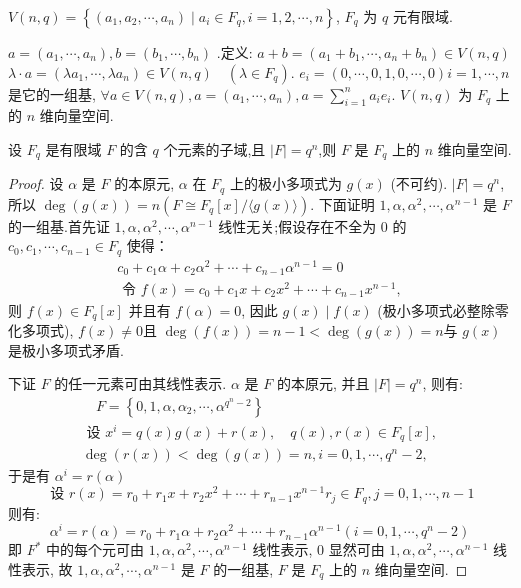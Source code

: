 \begin{example}
    $ V(n, q)=\left\{\left(a_{1}, a_{2}, \cdots, a_{n}\right) \mid a_{i} \in F_{q}, i=1,2, \cdots, n\right\} $, $ F_{q} $ 为 $ q $ 元有限域.
    
$ a=\left(a_{1}, \cdots, a_{n}\right), b=\left(b_{1}, \cdots, b_{n}\right)  $ .定义:
$ a+b=\left(a_{1}+b_{1}, \cdots, a_{n}+b_{n}\right) \in V(n, q) $\\
$ \lambda \cdot a=\left(\lambda a_{1}, \cdots, \lambda a_{n}\right) \in V(n, q) \quad\left(\lambda \in F_{q}\right) $. 
$ e_{i}=(0, \cdots, 0,1,0, \cdots, 0) i=1, \cdots, n $ 是它的一组基,
$ \forall a \in V(n, q), a=\left(a_{1}, \cdots, a_{n}\right), a=\sum\limits_{i=1}^{n} a_{i} e_{i} $. 
$ V(n, q) $ 为 $ F_{q} $ 上的 $ n $ 维向量空间.
\end{example}

\begin{theorem}
    设 $ F_{q} $ 是有限域 $ F $ 的含 $ q $ 个元素的子域,且 $ |F|=q^{n} $,则 $ F $ 是 $ F_{q} $ 上的 $ n $ 维向量空间.
\end{theorem}
\begin{proof}
    设 $ \alpha $ 是 $ F $ 的本原元, $ \alpha $ 在 $ F_{q} $ 上的极小多项式为 $ g(x) $ (不可约). $ |F|=q^{n} $, 所以 $ \operatorname{deg}(g(x))=n\left(F \cong F_{q}[x] /\langle g(x)\rangle\right) $. 下面证明 $ 1, \alpha, \alpha^{2}, \cdots, \alpha^{n-1} $ 是 $ F $ 的一组基.首先证 $ 1, \alpha, \alpha^{2}, \cdots, \alpha^{n-1} $ 线性无关;假设存在不全为 0 的 $ c_{0}, c_{1}, \cdots, c_{n-1} \in F_{q} $ 使得：
    $$
\begin{array}{c}
c_{0}+c_{1} \alpha+c_{2} \alpha^{2}+\cdots+c_{n-1} \alpha^{n-1}=0 \\
\text { 令 } f(x)=c_{0}+c_{1} x+c_{2} x^{2}+\cdots+c_{n-1} x^{n-1},
\end{array}
$$
则 $ f(x) \in F_{q}[x] $ 并且有 $ f(\alpha)=0 $,
因此 $ g(x) \mid f(x) $ (极小多项式必整除零化多项式), $ f(x) \neq 0 $且 $ \operatorname{deg}(f(x))=n-1<\operatorname{deg}(g(x))=n $与 $ g(x) $ 是极小多项式矛盾.

下证 $ F $ 的任一元素可由其线性表示. $ \alpha $ 是 $ F $ 的本原元, 并且 $ |F|=q^{n} $, 则有:
$$
\begin{array}{l}
\quad F=\left\{0,1, \alpha, \alpha_{2}, \cdots, \alpha^{q^{n}-2}\right\} \\
\text { 设 } x^{i}=q(x) g(x)+r(x), \quad q(x), r(x) \in F_{q}[x], \\
\operatorname{deg}(r(x))<\operatorname{deg}(g(x))=n, i=0,1, \cdots, q^{n}-2,
\end{array}
$$
于是有 $ \alpha^{i}=r(\alpha) $
$$
\text { 设 } r(x)=r_{0}+r_{1} x+r_{2} x^{2}+\cdots+r_{n-1} x^{n-1} r_{j} \in F_{q}, j=0,1, \cdots, n-1
$$
则有:
$$
\alpha^{i}=r(\alpha)=r_{0}+r_{1} \alpha+r_{2} \alpha^{2}+\cdots+r_{n-1} \alpha^{n-1}\left(i=0,1, \cdots, q^{n}-2\right)
$$
即 $ F^{*} $ 中的每个元可由 $ 1, \alpha, \alpha^{2}, \cdots, \alpha^{n-1} $ 线性表示,
0 显然可由 $ 1, \alpha, \alpha^{2}, \cdots, \alpha^{n-1} $ 线性表示,
故 $ 1, \alpha, \alpha^{2}, \cdots, \alpha^{n-1} $ 是 $ F $ 的一组基, $ F $ 是 $ F_{q} $ 上的 $ n $ 维向量空间.
\end{proof}


